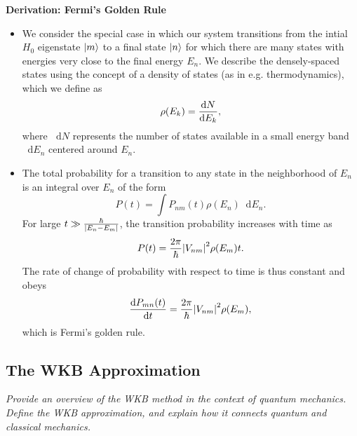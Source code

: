 \documentclass[11pt, a4paper]{article}
\newcommand{\diff}{\mathop{}\!\mathrm{d}} %
\begin{document}
\textbf{Derivation: Fermi's Golden Rule}
\begin{itemize}
    \item We consider the special case in which our system transitions from the intial $ H_{0} $ eigenstate $ \ket{m} $ to a final state $ \ket{n} $ for which there are many states with energies very close to the final energy $ E_{n} $. We describe the densely-spaced states using the concept of a density of states (as in e.g. thermodynamics), which we define as
    \begin{equation*}
        \rho(E_{k}) = \dv{N}{E_{k}},
    \end{equation*}
    where $ \diff N $ represents the number of states available in a small energy band $ \diff E_{n} $ centered around $ E_{n} $. 

    \item The total probability for a transition to any state in the neighborhood of $ E_{n} $ is an integral over $ E_{n} $ of the form
    \begin{equation*}
        P(t) = \int P_{nm}(t)\rho(E_{n})\diff E_{n}.
    \end{equation*}
    For large $ t \gg \frac{\hbar}{\abs{E_{n} - E_{m}}} $, the transition probability increases with time as
    \begin{equation*}
        P(t) = \frac{2\pi}{\hbar} \abs{V_{nm}}^{2}\rho(E_{m})t.
    \end{equation*}
    The rate of change of probability with respect to time is thus constant and obeys
    \begin{equation*}
        \dv{P_{mn}(t)}{t} = \frac{2\pi}{\hbar} \abs{V_{nm}}^{2}\rho(E_{m}),
    \end{equation*}
    which is Fermi's golden rule.
    
\end{itemize}


\subsection{The WKB Approximation}
\textit{Provide an overview of the WKB method in the context of quantum mechanics. Define the WKB approximation, and explain how it connects quantum and classical mechanics.}
\end{document}
